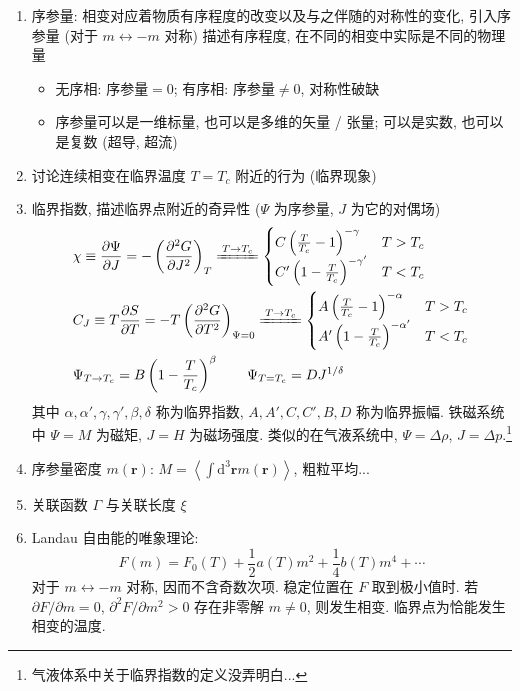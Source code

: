 \documentclass[12pt,a4paper]{article}%
\numberwithin{equation}{section}
\renewcommand*{\vec}[1]{\bm{#1}}%
\newcommand{\dif}{\mathrm{d}}
\begin{document}
\begin{enumerate}
    \item 序参量: 相变对应着物质有序程度的改变以及与之伴随的对称性的变化, 
    引入序参量 (对于 $m \leftrightarrow -m$ 对称) 描述有序程度, 在不同的相变中实际是不同的物理量
    \begin{itemize}
        \item 无序相: 序参量$= 0$; 
        有序相: 序参量$\neq 0$, 对称性破缺
        \item 序参量可以是一维标量, 也可以是多维的矢量 / 张量; 
        可以是实数, 也可以是复数 (超导, 超流)
    \end{itemize}
    \item 讨论连续相变在临界温度 $T = T_c$ 附近的行为 (临界现象)
    \item 临界指数, 描述临界点附近的奇异性 ($\Psi$ 为序参量, $J$ 为它的对偶场)
    \begin{align}
        &\chi \equiv \frac{\partial \Psi}{\partial J} = -\left(\frac{\partial^2G}{\partial J^2}\right)_T 
         \xlongequal{T\to T_c} \begin{cases}
            C\left(\frac{T}{T_c} - 1\right)^{-\gamma} &T>T_c \\
            C'\left(1 - \frac{T}{T_c}\right)^{-\gamma'} &T<T_c
        \end{cases}\\
        &C_J \equiv T\frac{\partial S}{\partial T} = -T\left(\frac{\partial^2G}{\partial T^2}\right)_{\Psi = 0} 
         \xlongequal{T\to T_c} \begin{cases}
            A\left(\frac{T}{T_c} - 1\right)^{-\alpha} &T>T_c \\
            A'\left(1 - \frac{T}{T_c}\right)^{-\alpha'} &T<T_c
        \end{cases}\\
        &\Psi_{T\to T_c} = B\left(1-\frac{T}{T_c}\right)^\beta \qquad
        \Psi_{T = T_c} = DJ^{1/\delta}
    \end{align}
    其中 $\alpha, \alpha', \gamma, \gamma', \beta, \delta$ 称为临界指数, $A, A', C, C', B, D$ 称为临界振幅. 
    铁磁系统中 $\Psi = M$ 为磁矩, $J = H$ 为磁场强度. 
    类似的在气液系统中, $\Psi = \Delta\rho$, $J = \Delta p$.\footnote{气液体系中关于临界指数的定义没弄明白...}
    \item 序参量密度 $m(\vec r)$: $M = \left\langle \int\dif^3\vec rm(\vec r)\right\rangle$, 粗粒平均...
    \item 关联函数 $\Gamma$ 与关联长度 $\xi$
    \item Landau 自由能的唯象理论:
    \begin{equation}
        F(m) = F_0(T) + \frac 12 a(T)m^2 + \frac 14b(T)m^4 + \cdots
    \end{equation}
    对于 $m \leftrightarrow -m$ 对称, 因而不含奇数次项. 稳定位置在 $F$ 取到极小值时. 若$\partial F/\partial m = 0$, $\partial^2 F /\partial m^2 > 0$ 存在非零解 $m\neq 0$, 则发生相变. 临界点为恰能发生相变的温度. 


\end{enumerate}
\end{document}
